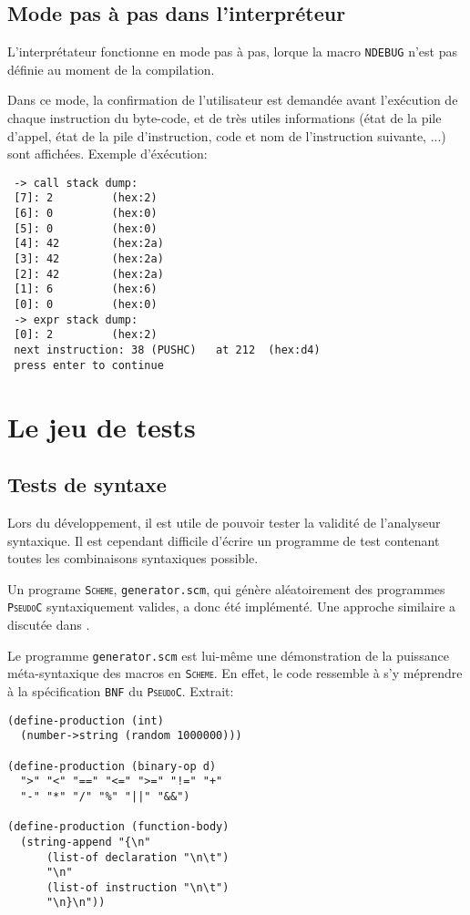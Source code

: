 \documentclass[12pt,a4paper,openright]{report}
\newcommand{\nom}[1]{\textsc{\texttt{#1}}}
\newcommand{\pc}{\nom{PseudoC}}
\begin{document}
    \section{Mode pas à pas dans l'interpréteur}
        L'interprétateur fonctionne en mode pas à pas, lorque la
        macro \nom{NDEBUG} n'est pas définie au moment de la compilation.
        
        Dans ce mode, la confirmation de l'utilisateur est demandée
        avant l'exécution de chaque instruction du byte-code, et de très
        utiles informations (état de la pile d'appel, état de la pile
        d'instruction, code et nom de l'instruction suivante, ...) sont
        affichées. Exemple d'éxécution:

\begin{verbatim}
 -> call stack dump:
 [7]: 2         (hex:2)
 [6]: 0         (hex:0)
 [5]: 0         (hex:0)
 [4]: 42        (hex:2a)
 [3]: 42        (hex:2a)
 [2]: 42        (hex:2a)
 [1]: 6         (hex:6)
 [0]: 0         (hex:0)
 -> expr stack dump:
 [0]: 2         (hex:2)
 next instruction: 38 (PUSHC)   at 212  (hex:d4)
 press enter to continue
\end{verbatim}

\chapter{Le jeu de tests}
    \section{Tests de syntaxe}
        Lors du développement, il est utile de pouvoir tester la
        validité de l'analyseur syntaxique. Il est cependant difficile
        d'écrire un programme de test contenant toutes les combinaisons
        syntaxiques possible.

        Un programe \nom{Scheme}, \texttt{generator.scm}, qui génère
        aléatoirement des programmes \pc{} syntaxiquement valides, a donc été
        implémenté. Une approche similaire a discutée dans \cite{AGTC}.

        Le programme \texttt{generator.scm} est lui-même une démonstration de la
        puissance méta-syntaxique des macros en \nom{Scheme}.
        En effet, le code ressemble à s'y méprendre à la spécification
        \nom{BNF} du \pc. Extrait:

\begin{verbatim}
(define-production (int)
  (number->string (random 1000000)))

(define-production (binary-op d)
  ">" "<" "==" "<=" ">=" "!=" "+"
  "-" "*" "/" "%" "||" "&&")

(define-production (function-body)
  (string-append "{\n"
      (list-of declaration "\n\t")
      "\n"
      (list-of instruction "\n\t")
      "\n}\n"))
\end{verbatim}
\end{document}
